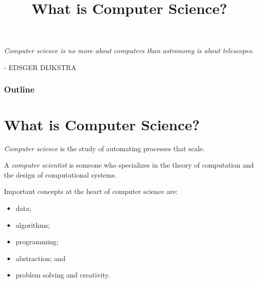 \documentclass[8pt,a4paper,compress,handout]{beamer}
\title{What is Computer Science?}
\date{}
\begin{document}
\begin{frame}
\hfill
\begin{minipage}{150pt}
\begin{flushright}
\tiny \emph{Computer science is no more about computers than astronomy is about telescopes.} 

\smallskip

- EDSGER DIJKSTRA
\end{flushright}
\end{minipage}
\titlepage
\end{frame}

\begin{frame}
\frametitle{Outline}
\tableofcontents
\end{frame}

\section{What is Computer Science?}
\begin{frame}[fragile]
\emph{Computer science} is the study of automating processes that scale. 

\bigskip

A \emph{computer scientist} is someone who specializes in the theory of computation and the design of computational systems.

\bigskip

Important concepts at the heart of computer science are: 
\begin{itemize}
\item data;  
\item algorithms; 
\item programming; 
\item abstraction; and 
\item problem solving and creativity.
\end{itemize}
\end{frame}
\end{document}
